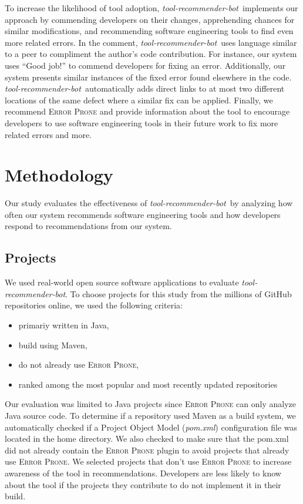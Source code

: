 \documentclass[sigconf,review,anonymous]{acmart}
\newcommand{\tool}{\textsl{tool-recommender-bot}}
\begin{document}
To increase the likelihood of tool adoption, \tool~implements our approach by commending developers on their changes, apprehending chances for similar modifications, and recommending software engineering tools to find even more related errors. In the comment, \tool~uses language similar to a peer to compliment the author's code contribution. For instance, our system uses ``Good job!'' to commend developers for fixing an error. Additionally, our system presents similar instances of the fixed error found elsewhere in the code.  \tool~automatically adds direct links to at most two different locations of the same defect where a similar fix can be applied. Finally, we recommend \textsc{Error Prone} and provide information about the tool to encourage developers to use software engineering tools in their future work to fix more related errors and more.

\section{Methodology}

Our study evaluates the effectiveness of \tool~by analyzing how often our system recommends software engineering tools and how developers respond to recommendations from our system.

\subsection{Projects}

We used real-world open source software applications to evaluate \tool. To choose projects for this study from the millions of GitHub repositories online, we used the following criteria:

\begin{itemize}
\item primariy written in Java,
\item build using Maven,
\item do not already use \textsc{Error Prone},
\item ranked among the most popular and most recently updated repositories
\end{itemize}

Our evaluation was limited to Java projects since \textsc{Error Prone} can only analyze Java source code. To determine if a repository used Maven as a build system, we automatically checked if a Project Object Model (\textit{pom.xml}) configuration file was located in the home directory. We also checked to make sure that the pom.xml did not already contain the \textsc{Error Prone} plugin to avoid projects that already use \textsc{Error Prone}. We selected projects that don't use \textsc{Error Prone} to increase awareness of the tool in recommendations. Developers are less likely to know about the tool if the projects they contribute to do not implement it in their build. 
\end{document}
